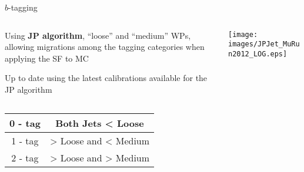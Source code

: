 \begin{frame}{$b$-tagging}
  \begin{columns}
    \begin{column}{0.4\textwidth}
      \begin{itemize}
        {\small
        \item Using {\bf JP algorithm}, ``loose'' and ``medium'' WPs, allowing migrations among the tagging categories when applying the SF to MC
        \item Up to date using the latest calibrations available for the JP algorithm
        }
      \end{itemize}
      
    \end{column}
    
    \begin{column}{0.6\textwidth}
      \texttt{[image: images/JPJet\_MuRun2012\_LOG.eps]}
    \end{column}
  \end{columns}
 \begin{center}
  \begin{tabular}{|c|c|}\hline
    0 - tag  & Both Jets < Loose \\ \hline 
    1 - tag  & > Loose and < Medium \\ \hline
    2 - tag  & > Loose and > Medium \\ \hline
  \end{tabular}
  \end{center}
\end{frame}



